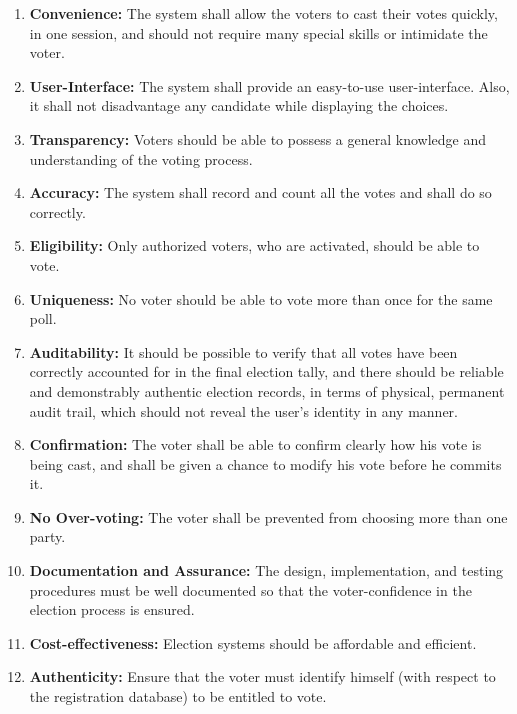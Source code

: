 \begin{enumerate}
	\item \textbf{Convenience:} The system shall allow the voters to cast their votes quickly, in one session, and should not require many special skills or intimidate the voter.
	
	\item \textbf{User-Interface:} The system shall provide an easy-to-use user-interface. Also, it shall not disadvantage any candidate while displaying the choices.
	
	\item \textbf{Transparency:} Voters should be able to possess a general knowledge and understanding of the voting process.
	
	\item \textbf{Accuracy:} The system shall record and count all the votes and shall do so correctly.
	
	\item \textbf{Eligibility:} Only authorized voters, who are activated, should be able to vote.
	
	\item \textbf{Uniqueness:} No voter should be able to vote more than once for the same poll.
	
	\item \textbf{Auditability:} It should be possible to verify that all votes have been correctly accounted for in the final election tally, and there should be reliable and demonstrably authentic election records, in terms of physical, permanent audit trail, which should not reveal the user’s identity in any manner.
	
	\item \textbf{Confirmation:} The voter shall be able to confirm clearly how his vote is being cast, and shall be given a chance to modify his vote before he commits it.
	
	\item \textbf{No Over-voting:} The voter shall be prevented from choosing more than one party.
	
	\item \textbf{Documentation and Assurance:} The design, implementation, and testing procedures must be well documented so that the voter-confidence in the election process is ensured.
	
	\item \textbf{Cost-effectiveness:} Election systems should be affordable and efficient.
	
	\item \textbf{Authenticity:} Ensure that the voter must identify himself (with respect to the registration database) to be entitled to vote.
	

\end{enumerate}
